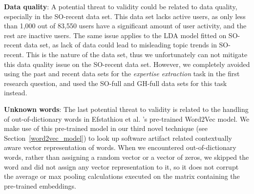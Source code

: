         \textbf{Data quality}: A potential threat to validity could be related to data quality, especially in the SO-recent data set. This data set lacks active users, as only less than 1,000 out of 83,550 users have a significant amount of user activity, and the rest are inactive users. The same issue applies to the LDA model fitted on SO-recent data set, as lack of data could lead to misleading topic trends in SO-recent. This is the nature of the data set, thus we unfortunately can not mitigate this data quality issue on the SO-recent data set. However, we completely avoided using the past and recent data sets for the \emph{expertise extraction} task in the first research question, and used the SO-full and GH-full data sets for this task instead.
        
        \textbf{Unknown words}: The last potential threat to validity is related to the handling of out-of-dictionary words in Efstathiou et al. \cite{efstathiou2018word}'s pre-trained Word2Vec model. We make use of this pre-trained model in our third novel technique (see Section~\ref{word2vec_model}) to look up software artifact related contextually aware vector representation of words. When we encountered out-of-dictionary words, rather than assigning a random vector or a vector of zeros, we skipped the word and did not assign any vector representation to it, so it does not corrupt the average or max pooling calculations executed on the matrix containing the pre-trained embeddings. 
        
        
